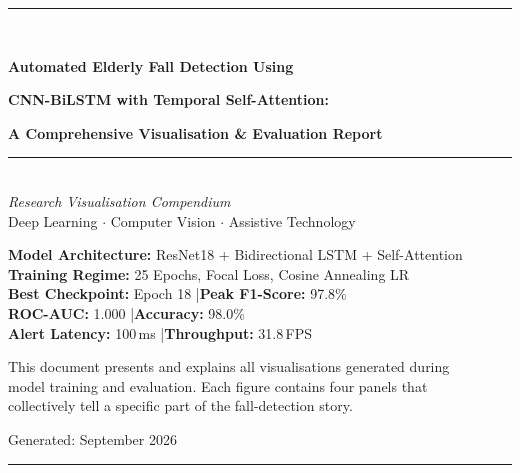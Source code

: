 \documentclass[12pt,a4paper]{article}
\begin{document}
\begin{titlepage}
    \centering
    \vspace*{2cm}

    {\color{accentblue}\rule{\linewidth}{2pt}}\\[12pt]

    {\LARGE\bfseries Automated Elderly Fall Detection Using\par}
    {\LARGE\bfseries CNN-BiLSTM with Temporal Self-Attention:\par}
    {\large\bfseries A Comprehensive Visualisation \& Evaluation Report\par}

    \vspace{8pt}
    {\color{accentblue}\rule{\linewidth}{0.8pt}}\\[24pt]

    {\large\itshape Research Visualisation Compendium}\\[6pt]
    {\normalsize Deep Learning $\cdot$ Computer Vision $\cdot$ Assistive Technology}\\[24pt]

    \begin{tcolorbox}[colback=lightgray, colframe=accentblue, arc=4pt, width=0.85\textwidth]
        \centering\small
        \textbf{Model Architecture:} ResNet18 + Bidirectional LSTM + Self-Attention\\[4pt]
        \textbf{Training Regime:} 25 Epochs, Focal Loss, Cosine Annealing LR\\[4pt]
        \textbf{Best Checkpoint:} Epoch 18 \quad|\quad \textbf{Peak F1-Score:} 97.8\%\\[4pt]
        \textbf{ROC-AUC:} 1.000 \quad|\quad \textbf{Accuracy:} 98.0\%\\[4pt]
        \textbf{Alert Latency:} 100\,ms \quad|\quad \textbf{Throughput:} 31.8\,FPS
    \end{tcolorbox}

    \vspace{24pt}
    {\small\color{gray} This document presents and explains all visualisations generated during\\
    model training and evaluation. Each figure contains four panels that\\
    collectively tell a specific part of the fall-detection story.}

    \vfill
    {\small\color{darkgray}Generated: September 2026}\\[6pt]
    {\color{accentblue}\rule{\linewidth}{2pt}}
\end{titlepage}
\end{document}
